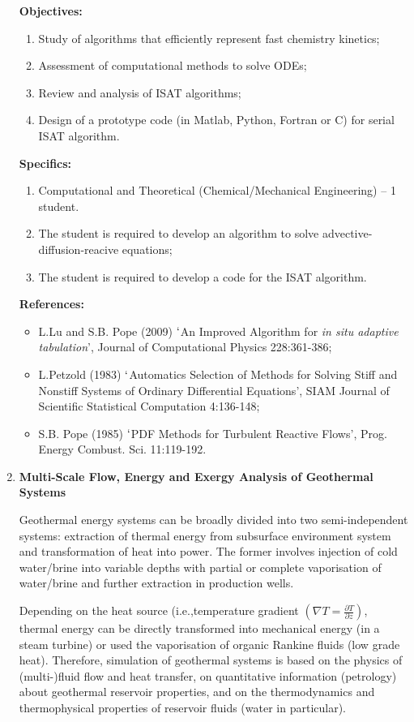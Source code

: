 \documentclass[12pts,a4paper,amsmath,amssymb,floatfix]{article}%
\begin{document}
\begin{enumerate}[label=\bfseries Project \arabic*:]
\noindent
{\bf Objectives:}
\begin{enumerate}
\item Study of algorithms that efficiently represent fast chemistry kinetics;
\item Assessment of computational methods to solve ODEs;
\item Review and analysis of ISAT algorithms;
\item Design of a prototype code (in Matlab, Python, Fortran or C) for serial ISAT algorithm.
\end{enumerate} 
 
\noindent
{\bf Specifics:} 
\begin{enumerate}
\item Computational and Theoretical (Chemical/Mechanical Engineering) -- 1 student.
\item The student is required to develop an algorithm to solve advective-diffusion-reacive equations;
\item The student is required to develop a code for the ISAT algorithm.
\end{enumerate}

\noindent
{\bf References:}
\begin{itemize}
\item L.Lu and S.B. Pope (2009) $\lq$An Improved Algorithm for {\it in situ adaptive tabulation}’, Journal of Computational Physics 228:361-386;
\item L.Petzold (1983) $\lq$Automatics Selection of Methods for Solving Stiff and Nonstiff Systems of Ordinary Differential Equations', SIAM Journal of Scientific Statistical Computation 4:136-148;
\item S.B. Pope (1985)  $\lq$PDF Methods for Turbulent Reactive Flows',  Prog. Energy Combust. Sci. 11:119-192.
\end{itemize}

\clearpage
\item {\bf Multi-Scale Flow, Energy and Exergy Analysis of Geothermal Systems}

Geothermal energy systems can be broadly divided into two semi-independent systems: extraction of thermal energy from subsurface environment system and transformation of heat into power. The former involves injection of cold water/brine into variable depths with partial or complete vaporisation of water/brine and further extraction in production wells. 

Depending on the heat source (i.e.,temperature gradient $\left(\nabla T=\frac{\partial T}{\partial z}\right)$, thermal energy can be directly transformed into mechanical energy (in a steam turbine) or used the vaporisation of organic Rankine fluids (low grade heat). Therefore, simulation of geothermal systems is based on the physics of (multi-)fluid flow and heat transfer, on quantitative information (petrology) about geothermal reservoir properties, and on the thermodynamics and thermophysical properties of reservoir fluids (water in particular). 



\end{enumerate}
\end{document}
